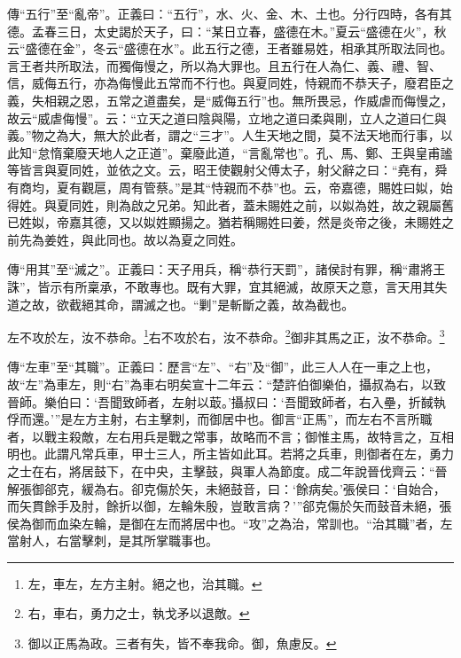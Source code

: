 {\noindent\zhuan{}\fzbyks 傳“五行”至“亂帝”。正義曰：“五行”，水、火、金、木、土也。分行四時，各有其德。孟春三日，太史謁於天子，曰：“某日立春，盛德在木。”夏云“盛德在火”，秋云“盛德在金”，冬云“盛德在水”。此五行之德，王者雖易姓，相承其所取法同也。言王者共所取法，而獨侮慢之，所以為大罪也。且五行在人為仁、義、禮、智、信，威侮五行，亦為侮慢此五常而不行也。與夏同姓，恃親而不恭天子，廢君臣之義，失相親之恩，五常之道盡矣，是“威侮五行”也。無所畏忌，作威虐而侮慢之，故云“威虐侮慢”。云：“立天之道曰陰與陽，立地之道曰柔與剛，立人之道曰仁與義。”物之為大，無大於此者，謂之“三才”。人生天地之間，莫不法天地而行事，以此知“怠惰棄廢天地人之正道”。棄廢此道，“言亂常也”。孔、馬、鄭、王與皇甫謐等皆言與夏同姓，並依之文。云，昭王使觀射父傅太子，射父辭之曰：“堯有，舜有商均，夏有觀扈，周有管蔡。”是其“恃親而不恭”也。云，帝嘉德，賜姓曰姒，始得姓。與夏同姓，則為啟之兄弟。知此者，蓋未賜姓之前，以姒為姓，故之親屬舊已姓姒，帝嘉其德，又以姒姓顯揚之。猶若稱賜姓曰姜，然是炎帝之後，未賜姓之前先為姜姓，與此同也。故以為夏之同姓。 \par}

{\noindent\zhuan{}\fzbyks 傳“用其”至“滅之”。正義曰：天子用兵，稱“恭行天罰”，諸侯討有罪，稱“肅將王誅”，皆示有所稟承，不敢專也。既有大罪，宜其絕滅，故原天之意，言天用其失道之故，欲截絕其命，謂滅之也。“剿”是斬斷之義，故為截也。 \par}

左不攻於左，汝不恭命。\footnote{左，車左，左方主射。絕之也，治其職。}右不攻於右，汝不恭命。\footnote{右，車右，勇力之士，執戈矛以退敵。}御非其馬之正，汝不恭命。\footnote{御以正馬為政。三者有失，皆不奉我命。御，魚慮反。}


{\noindent\zhuan{}\fzbyks 傳“左車”至“其職”。正義曰：歷言“左”、“右”及“御”，此三人人在一車之上也，故“左”為車左，則“右”為車右明矣宣十二年云：“楚許伯御樂伯，攝叔為右，以致晉師。樂伯曰：‘吾聞致師者，左射以菆。’攝叔曰：‘吾聞致師者，右入壘，折馘執俘而還。’”是左方主射，右主擊刺，而御居中也。御言“正馬”，而左右不言所職者，以戰主殺敵，左右用兵是戰之常事，故略而不言；御惟主馬，故特言之，互相明也。此謂凡常兵車，甲士三人，所主皆如此耳。若將之兵車，則御者在左，勇力之士在右，將居鼓下，在中央，主擊鼓，與軍人為節度。成二年說晉伐齊云：“晉解張御郤克，緩為右。卻克傷於矢，未絕鼓音，曰：‘餘病矣。’張侯曰：‘自始合，而矢貫餘手及肘，餘折以御，左輪朱殷，豈敢言病？’”郤克傷於矢而鼓音未絕，張侯為御而血染左輪，是御在左而將居中也。“攻”之為治，常訓也。“治其職”者，左當射人，右當擊刺，是其所掌職事也。 \par}

